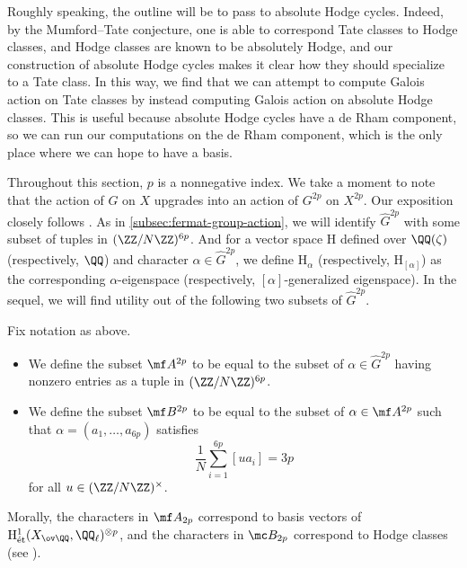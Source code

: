 \documentclass[../thesis.tex]{subfiles}
\begin{document}
Roughly speaking, the outline will be to pass to absolute Hodge cycles. Indeed, by the Mumford--Tate conjecture, one is able to correspond Tate classes to Hodge classes, and Hodge classes are known to be absolutely Hodge, and our construction of absolute Hodge cycles makes it clear how they should specialize to a Tate class. In this way, we find that we can attempt to compute Galois action on Tate classes by instead computing Galois action on absolute Hodge classes. This is useful because absolute Hodge cycles have a de Rham component, so we can run our computations on the de Rham component, which is the only place where we can hope to have a basis.

Throughout this section, $p$ is a nonnegative index. We take a moment to note that the action of $G$ on $X$ upgrades into an action of $G^{2p}$ on $X^{2p}$. Our exposition closely follows \cite[Subsection~8.5]{ggl-fermat}. As in \cref{subsec:fermat-group-action}, we will identify $\widehat G^{2p}$ with some subset of tuples in $(\ZZ/N\ZZ)^{6p}$. And for a vector space $\mathrm H$ defined over $\QQ(\zeta)$ (respectively, $\QQ$) and character $\alpha\in\widehat G^{2p}$, we define $\mathrm H_\alpha$ (respectively, $\mathrm H_{[\alpha]}$) as the corresponding $\alpha$-eigenspace (respectively, $[\alpha]$-generalized eigenspace). In the sequel, we will find utility out of the following two subsets of $\widehat G^{2p}$.
\begin{definition}
	Fix notation as above.
	\begin{itemize}
		\item We define the subset $\mf A^{2p}$ to be equal to the subset of $\alpha\in\widehat G^{2p}$ having nonzero entries as a tuple in $(\ZZ/N\ZZ)^{6p}$.
		\item We define the subset $\mf B^{2p}$ to be equal to the subset of $\alpha\in\mf A^{2p}$ such that $\alpha=(a_1,\ldots,a_{6p})$ satisfies
		\[\frac1N\sum_{i=1}^{6p}[ua_i]=3p\]
		for all $u\in(\ZZ/N\ZZ)^\times$.
	\end{itemize}
\end{definition}
Morally, the characters in $\mf A_{2p}$ correspond to basis vectors of $\mathrm H^1_{\mathrm{\acute et}}(X_{\ov\QQ},\QQ_\ell)^{\otimes p}$, and the characters in $\mc B_{2p}$ correspond to Hodge classes (see ).
\end{document}
